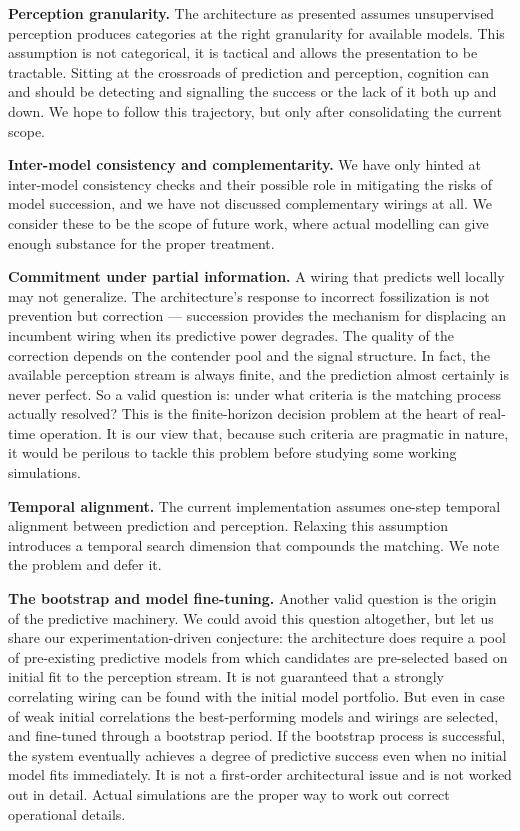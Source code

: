 \documentclass[12pt, a4paper]{article}
\begin{document}
\noindent\textbf{Perception granularity.} The architecture as presented assumes
unsupervised perception produces categories at the right granularity for
available models. This assumption is not categorical, it is tactical and
allows the presentation to be tractable. Sitting at the crossroads of
prediction and perception, cognition can and should be detecting and
signalling the success or the lack of it both up and down. We hope to
follow this trajectory, but only after consolidating the current scope.

\noindent\textbf{Inter-model consistency and complementarity.} We have only
hinted at inter-model consistency checks and their possible role in
mitigating the risks of model succession, and we have not discussed
complementary wirings at all. We consider these to be the scope of
future work, where actual modelling can give enough substance for the
proper treatment.

\noindent\textbf{Commitment under partial information.} A wiring that predicts
well locally may not generalize. The architecture's response to
incorrect fossilization is not prevention but correction --- succession
provides the mechanism for displacing an incumbent wiring when its
predictive power degrades. The quality of the correction depends on the
contender pool and the signal structure. In fact, the available
perception stream is always finite, and the prediction almost certainly
is never perfect. So a valid question is: under what criteria is the
matching process actually resolved? This is the finite-horizon decision
problem at the heart of real-time operation. It is our view that,
because such criteria are pragmatic in nature, it would be perilous to
tackle this problem before studying some working simulations.

\noindent\textbf{Temporal alignment.} The current implementation assumes one-step
temporal alignment between prediction and perception. Relaxing this
assumption introduces a temporal search dimension that compounds the
matching. We note the problem and defer it.

\noindent\textbf{The bootstrap and model fine-tuning.} Another valid question is
the origin of the predictive machinery. We could avoid this question
altogether, but let us share our experimentation-driven conjecture: the
architecture does require a pool of pre-existing predictive models from
which candidates are pre-selected based on initial fit to the perception
stream. It is not guaranteed that a strongly correlating wiring can be
found with the initial model portfolio. But even in case of weak initial
correlations the best-performing models and wirings are selected, and
fine-tuned through a bootstrap period. If the bootstrap process is
successful, the system eventually achieves a degree of predictive
success even when no initial model fits immediately. It is not a
first-order architectural issue and is not worked out in detail. Actual
simulations are the proper way to work out correct operational details.
\end{document}
